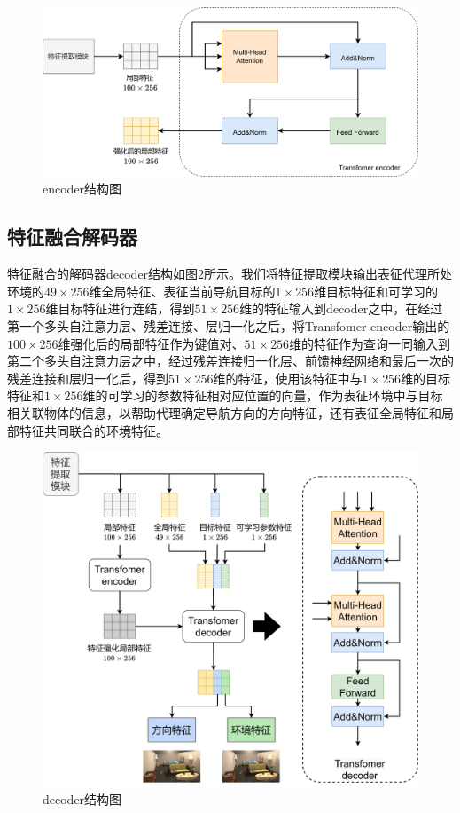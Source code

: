 \begin{figure}[htbp]
    \centering
    \includegraphics[scale=0.06]{Fig/encoder.png}
    \caption{\label{encoder}encoder结构图}
\end{figure}


\subsection{特征融合解码器}
特征融合的解码器decoder结构如图\ref{decoder}所示。我们将特征提取模块输出表征代理所处环境的$49 \times 256$维全局特征、表征当前导航目标的$1 \times 256$维目标特征和可学习的$1 \times 256$维目标特征进行连结，得到$51 \times 256$维的特征输入到decoder之中，在经过第一个多头自注意力层、残差连接、层归一化之后，将Transfomer encoder输出的$100 \times 256$维强化后的局部特征作为键值对、$51 \times 256$维的特征作为查询一同输入到第二个多头自注意力层之中，经过残差连接归一化层、前馈神经网络和最后一次的残差连接和层归一化后，得到$51 \times 256$维的特征，使用该特征中与$1 \times 256$维的目标特征和$1 \times 256$维的可学习的参数特征相对应位置的向量，作为表征环境中与目标相关联物体的信息，以帮助代理确定导航方向的方向特征，还有表征全局特征和局部特征共同联合的环境特征。
\begin{figure}[htbp]
    \centering
    \includegraphics[scale=0.08]{Fig/decoder.png}
    \caption{\label{decoder}decoder结构图}
\end{figure}


